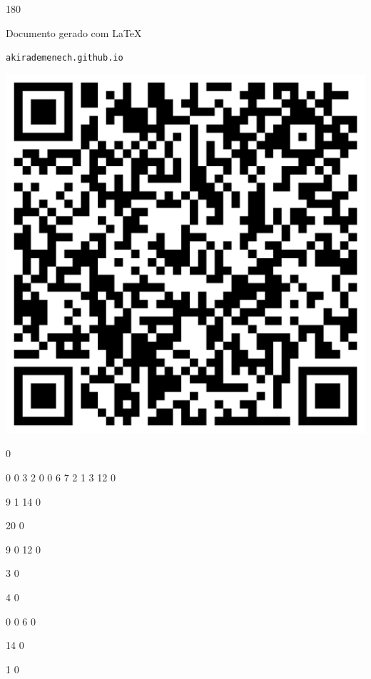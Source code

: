 \documentclass[12pt]{article}
\begin{document}
	\begin{turn}{180}	
		\begin{minipage}{\textwidth}		  
		  Documento gerado com \LaTeX			
		  
		  \texttt{akirademenech.github.io}

		  \includegraphics[height=0.3\textheight]{2e-2.pdf}

		\end{minipage}	
	\end{turn}  
		  
		\vfill  
		  
{
	0	%

	0	%
	0	%
	3	%
	2	%
	0	%
	0	%
	6	%
	7	%
	2	%
	1	%
	3	%
	12	%
	0	%

	9	%
	1	%
	14	%
	0	%

	20	%
	0	%

	9	%
	0	%
	12	%
	0	%

	3	%
	0	%

	4	%
	0	%

	0	%
	0	%
	6	%
	0	%

	14	%
	0	%

	1	%
	0	%

}	  
		    	
\end{document}
